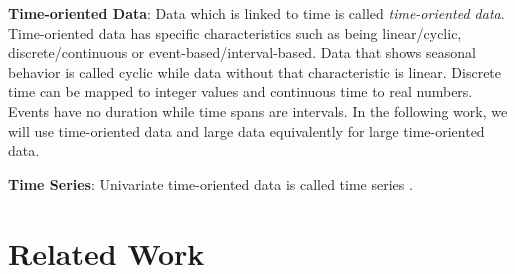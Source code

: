 \par
\textbf{Time-oriented Data}: Data which is linked to time\cite{Aigner2011} is called \textit{time-oriented data}. Time-oriented data has specific characteristics such as being linear/cyclic, discrete/continuous or event-based/interval-based. Data that shows seasonal behavior is called cyclic while data without that characteristic is linear. Discrete time can be mapped to integer values and continuous time to real numbers. Events have no duration while time spans are intervals. In the following work, we will use time-oriented data and large data equivalently for large time-oriented data.
\par
\textbf{Time Series}: Univariate time-oriented data is called time series \cite{Aigner2011,  Buono2005,  Walker2016,  Leonard2005,  Chen1993,  Esling2012}.
\par

\section{Related Work}\label{chap:related}
